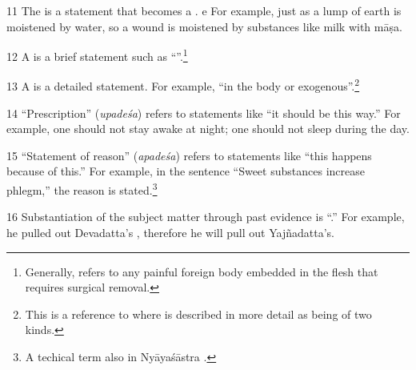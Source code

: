\begin{translation}
\item [11] The  is a 
statement that becomes
a . e
For example, just as a lump of earth is
moistened by water, so a wound is moistened by substances like milk with
\gls{māṣa}.%

\item [12] A  is a brief statement such as 
“”.\footnote{Generally,  refers to any painful 
foreign body embedded in the flesh that requires surgical removal.}

\item [13] A  is a detailed statement. For example, “in 
the body or exogenous”.\footnote{This is a reference to 
    where  is described in more detail as being of two kinds.} 

\item [14] “Prescription” (\emph{upadeśa}) refers 
to statements like 
``it should be 
this way.'' For example, one should not stay awake at night; 
one should not sleep during the day.  

\item [15] “Statement of reason”
(\emph{apadeśa}) refers to statements like “this happens because of this.” For
example, in the sentence “Sweet substances increase phlegm,” the reason is
stated.\footnote{A techical term also in Nyāyaśāstra \citep[54]{jhal-1978}.}

\item [16] Substantiation of the subject matter through past evidence is
“.” For example, he pulled out Devadatta's
, therefore he will pull out Yajñadatta's.


\end{translation}
